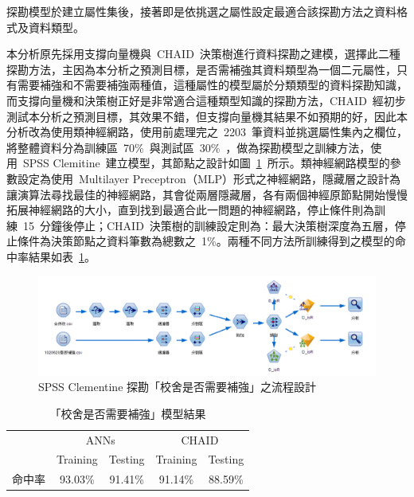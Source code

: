 探勘模型於建立屬性集後，接著即是依挑選之屬性設定最適合該探勘方法之資料格式及資料類型。

本分析原先採用支撐向量機與~CHAID~決策樹進行資料探勘之建模，選擇此二種探勘方法，主因為本分析之預測目標，是否需補強其資料類型為一個二元屬性，只有需要補強和不需要補強兩種值，這種屬性的模型屬於分類類型的資料探勘知識，而支撐向量機和決策樹正好是非常適合這種類型知識的探勘方法，CHAID~經初步測試本分析之預測目標，其效果不錯，但支撐向量機其結果不如預期的好，因此本分析改為使用類神經網路，使用前處理完之~2203~筆資料並挑選屬性集內之欄位，將整體資料分為訓練區~70\%~與測試區~30\%~，做為探勘模型之訓練方法，使用~SPSS Clemitine~建立模型，其節點之設計如圖~\ref{fig:spss-d_isr}~所示。類神經網路模型的參數設定為使用~Multilayer Preceptron（MLP）形式之神經網路，隱藏層之設計為讓演算法尋找最佳的神經網路，其會從兩層隱藏層，各有兩個神經原節點開始慢慢拓展神經網路的大小，直到找到最適合此一問題的神經網路，停止條件則為訓練~15~分鐘後停止；CHAID~決策樹的訓練設定則為：最大決策樹深度為五層，停止條件為決策節點之資料筆數為總數之~1\%。兩種不同方法所訓練得到之模型的命中率結果如表~\ref{tab:d_is_r_result}。

\begin{figure}[hbtp]
  \begin{center}
    \includegraphics[width=1.0\textwidth]{figures/d_isr_flow.png}
    \caption{SPSS Clementine 探勘「校舍是否需要補強」之流程設計} 
    \label{fig:spss-d_isr}
  \end{center}
\end{figure}


{\renewcommand{\arraystretch}{1.5}
\begin{table}[hbtp]
  \begin{center}
    \caption{「校舍是否需要補強」模型結果}
    \label{tab:d_is_r_result}
    \large
    \begin{tabular}{l c c c c}
      \hline
       & \multicolumn{2}{c}{ANNs} & \multicolumn{2}{c}{CHAID} \\
       & Training & Testing & Training & Testing \\
      \hline
     命中率 & 93.03\% & 91.41\% & 91.14\% & 88.59\% \\
      \hline
      \end{tabular}
  \end{center}
\end{table}
}

